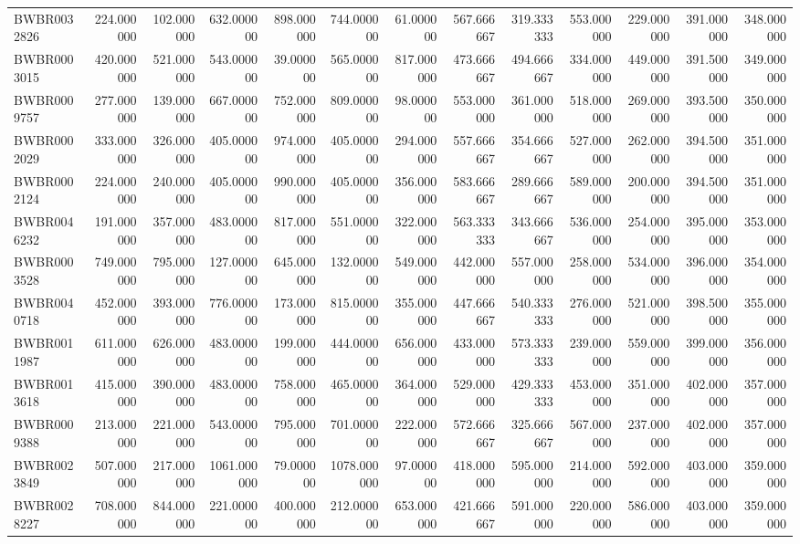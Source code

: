 \begin{longtable}{lrrrrrrrrrrrr}
BWBR0032826 & 224.000000 & 102.000000 & 632.000000 & 898.000000 & 744.000000 & 61.000000 & 567.666667 & 319.333333 & 553.000000 & 229.000000 & 391.000000 & 348.000000 \\
BWBR0003015 & 420.000000 & 521.000000 & 543.000000 & 39.000000 & 565.000000 & 817.000000 & 473.666667 & 494.666667 & 334.000000 & 449.000000 & 391.500000 & 349.000000 \\
BWBR0009757 & 277.000000 & 139.000000 & 667.000000 & 752.000000 & 809.000000 & 98.000000 & 553.000000 & 361.000000 & 518.000000 & 269.000000 & 393.500000 & 350.000000 \\
BWBR0002029 & 333.000000 & 326.000000 & 405.000000 & 974.000000 & 405.000000 & 294.000000 & 557.666667 & 354.666667 & 527.000000 & 262.000000 & 394.500000 & 351.000000 \\
BWBR0002124 & 224.000000 & 240.000000 & 405.000000 & 990.000000 & 405.000000 & 356.000000 & 583.666667 & 289.666667 & 589.000000 & 200.000000 & 394.500000 & 351.000000 \\
BWBR0046232 & 191.000000 & 357.000000 & 483.000000 & 817.000000 & 551.000000 & 322.000000 & 563.333333 & 343.666667 & 536.000000 & 254.000000 & 395.000000 & 353.000000 \\
BWBR0003528 & 749.000000 & 795.000000 & 127.000000 & 645.000000 & 132.000000 & 549.000000 & 442.000000 & 557.000000 & 258.000000 & 534.000000 & 396.000000 & 354.000000 \\
BWBR0040718 & 452.000000 & 393.000000 & 776.000000 & 173.000000 & 815.000000 & 355.000000 & 447.666667 & 540.333333 & 276.000000 & 521.000000 & 398.500000 & 355.000000 \\
BWBR0011987 & 611.000000 & 626.000000 & 483.000000 & 199.000000 & 444.000000 & 656.000000 & 433.000000 & 573.333333 & 239.000000 & 559.000000 & 399.000000 & 356.000000 \\
BWBR0013618 & 415.000000 & 390.000000 & 483.000000 & 758.000000 & 465.000000 & 364.000000 & 529.000000 & 429.333333 & 453.000000 & 351.000000 & 402.000000 & 357.000000 \\
BWBR0009388 & 213.000000 & 221.000000 & 543.000000 & 795.000000 & 701.000000 & 222.000000 & 572.666667 & 325.666667 & 567.000000 & 237.000000 & 402.000000 & 357.000000 \\
BWBR0023849 & 507.000000 & 217.000000 & 1061.000000 & 79.000000 & 1078.000000 & 97.000000 & 418.000000 & 595.000000 & 214.000000 & 592.000000 & 403.000000 & 359.000000 \\
BWBR0028227 & 708.000000 & 844.000000 & 221.000000 & 400.000000 & 212.000000 & 653.000000 & 421.666667 & 591.000000 & 220.000000 & 586.000000 & 403.000000 & 359.000000 \\

\end{longtable}
